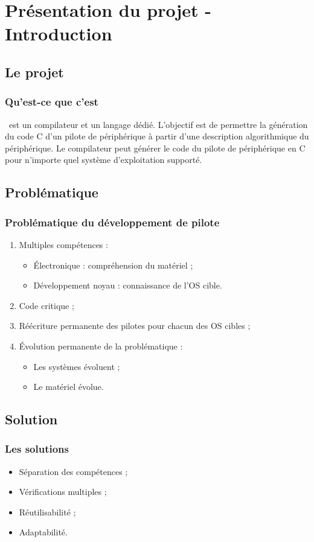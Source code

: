 \documentclass[]{beamer}
\title{\rtx}
\subtitle{Un DSL et son compilateur}
\author{David Pineau \\ \texttt{<david@lse.epitech.eu>}}
\begin{document}
\begin{frame}
\titlepage
\end{frame}



\section{Présentation du projet - Introduction}

\subsection{Le projet}
\begin{frame}
\frametitle{Qu'est-ce que c'est}
\rtx\ est un compilateur et un langage dédié. L'objectif est de permettre la
génération du code C d'un pilote de périphérique à partir d'une description
algorithmique du périphérique. Le compilateur peut générer le code du pilote de
périphérique en C pour n'importe quel système d'exploitation supporté.
\end{frame}

\subsection{Problématique}
\begin{frame}
\frametitle{Problématique du développement de pilote}
\begin{enumerate}[<+->]
    \item Multiples compétences :
        \begin{itemize}[<1->]
            \item Électronique : compréhension du matériel ;
            \item Développement noyau : connaissance de l'OS cible.
        \end{itemize}
    \item Code critique ;
    \item Réécriture permanente des pilotes pour chacun des OS cibles ;
    \item Évolution permanente de la problématique :
        \begin{itemize}
            \item Les systèmes évoluent ;
            \item Le matériel évolue.
        \end{itemize}
\end{enumerate}
\end{frame}

\subsection{Solution}
\begin{frame}
\frametitle{Les solutions}
\begin{itemize}[<+->]
    \item Séparation des compétences ;
    \item Vérifications multiples ;
    \item Réutilisabilité ;
    \item Adaptabilité.
\end{itemize}
\end{frame}
\end{document}
